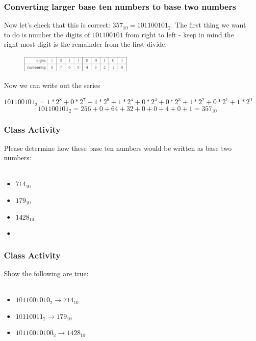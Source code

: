\documentclass{if-beamer}
\begin{document}
\begin{frame}
\frametitle{Converting larger base ten numbers to base two numbers}
Now let's check that this is correct: 
$357_{10} = 101100101_2$.
The first thing we want to do is number the digits of $101100101$ from right to left - keep in mind the right-most digit is the remainder from the first divide.
\begin{figure}
	\centering
	\includegraphics[width = 0.5\textwidth]{figures/digits.jpg}
\end{figure}
Now we can write out the series

$$101100101_2 = 1*2^8 + 0*2^7 + 1*2^6 + 1*2^5 + 0*2^4 + 0*2^3 + 1*2^2 + 0*2^1 + 1*2^0$$
$$101100101_2 = 256 + 0 + 64 + 32 + 0 + 0 + 4 + 0 + 1 = 357_{10}$$ 

\end{frame}

\begin{frame}
\frametitle{Class Activity}
\flushleft
Please determine how these base ten numbers would be written as base two numbers: \\~\

\begin{itemize}
	\setlength\itemsep{8em}
	\item $714_{10}$ \\
	\item $179_{10}$ \\
	\item $1428_{10}$ \\
	\item
\end{itemize}
\end{frame}

\begin{frame}
\frametitle{Class Activity}
Show the following are true: \\~\

\begin{itemize}
	\setlength\itemsep{8em}
	\item $1011001010_2 \rightarrow 714_{10}$
	\item $10110011_2 \rightarrow 179_{10}$
	\item $10110010100_2 \rightarrow 1428_{10}$
\end{itemize}
\end{frame}




\end{document}
